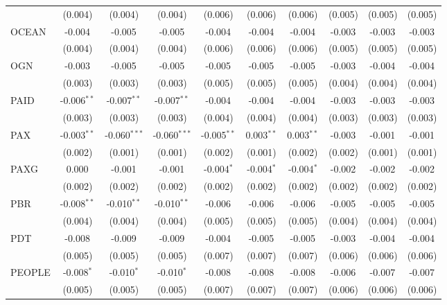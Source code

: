 \begin{table}[!htbp]
\begin{tabular}{@{\extracolsep{5pt}}lccccccccc}
  & (0.004) & (0.004) & (0.004) & (0.006) & (0.006) & (0.006) & (0.005) & (0.005) & (0.005) \\
 OCEAN & -0.004$^{}$ & -0.005$^{}$ & -0.005$^{}$ & -0.004$^{}$ & -0.004$^{}$ & -0.004$^{}$ & -0.003$^{}$ & -0.003$^{}$ & -0.003$^{}$ \\
  & (0.004) & (0.004) & (0.004) & (0.006) & (0.006) & (0.006) & (0.005) & (0.005) & (0.005) \\
 OGN & -0.003$^{}$ & -0.005$^{}$ & -0.005$^{}$ & -0.005$^{}$ & -0.005$^{}$ & -0.005$^{}$ & -0.003$^{}$ & -0.004$^{}$ & -0.004$^{}$ \\
  & (0.003) & (0.003) & (0.003) & (0.005) & (0.005) & (0.005) & (0.004) & (0.004) & (0.004) \\
 PAID & -0.006$^{**}$ & -0.007$^{**}$ & -0.007$^{**}$ & -0.004$^{}$ & -0.004$^{}$ & -0.004$^{}$ & -0.003$^{}$ & -0.003$^{}$ & -0.003$^{}$ \\
  & (0.003) & (0.003) & (0.003) & (0.004) & (0.004) & (0.004) & (0.003) & (0.003) & (0.003) \\
 PAX & -0.003$^{**}$ & -0.060$^{***}$ & -0.060$^{***}$ & -0.005$^{**}$ & 0.003$^{**}$ & 0.003$^{**}$ & -0.003$^{}$ & -0.001$^{}$ & -0.001$^{}$ \\
  & (0.002) & (0.001) & (0.001) & (0.002) & (0.001) & (0.002) & (0.002) & (0.001) & (0.001) \\
 PAXG & 0.000$^{}$ & -0.001$^{}$ & -0.001$^{}$ & -0.004$^{*}$ & -0.004$^{*}$ & -0.004$^{*}$ & -0.002$^{}$ & -0.002$^{}$ & -0.002$^{}$ \\
  & (0.002) & (0.002) & (0.002) & (0.002) & (0.002) & (0.002) & (0.002) & (0.002) & (0.002) \\
 PBR & -0.008$^{**}$ & -0.010$^{**}$ & -0.010$^{**}$ & -0.006$^{}$ & -0.006$^{}$ & -0.006$^{}$ & -0.005$^{}$ & -0.005$^{}$ & -0.005$^{}$ \\
  & (0.004) & (0.004) & (0.004) & (0.005) & (0.005) & (0.005) & (0.004) & (0.004) & (0.004) \\
 PDT & -0.008$^{}$ & -0.009$^{}$ & -0.009$^{}$ & -0.004$^{}$ & -0.005$^{}$ & -0.005$^{}$ & -0.003$^{}$ & -0.004$^{}$ & -0.004$^{}$ \\
  & (0.005) & (0.005) & (0.005) & (0.007) & (0.007) & (0.007) & (0.006) & (0.006) & (0.006) \\
 PEOPLE & -0.008$^{*}$ & -0.010$^{*}$ & -0.010$^{*}$ & -0.008$^{}$ & -0.008$^{}$ & -0.008$^{}$ & -0.006$^{}$ & -0.007$^{}$ & -0.007$^{}$ \\
  & (0.005) & (0.005) & (0.005) & (0.007) & (0.007) & (0.007) & (0.006) & (0.006) & (0.006) \\

\end{tabular}
\end{table}
